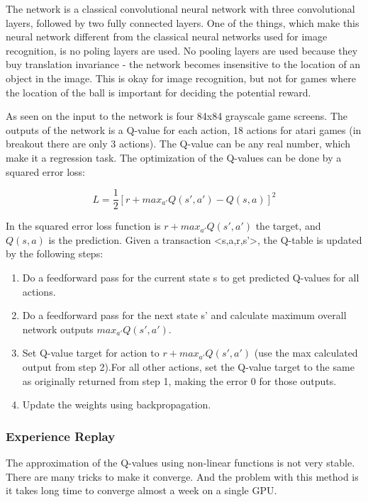 The network is a classical convolutional neural network with three convolutional layers, followed by two fully connected layers. One of the things, which make this neural network different from the classical neural networks used for image recognition, is no poling layers are used. No pooling layers are used because they buy translation invariance -  the network becomes insensitive to the location of an object in the image. This is okay for image recognition, but not for games where the location of the ball is important for deciding the potential reward.  

As seen on  the input to the network is four 84x84 grayscale game screens. The outputs of the network is a Q-value for each action, 18 actions for atari games (in breakout there are only 3 actions). The Q-value can be any real number, which make it a regression task. The optimization of the Q-values can be done by a squared error loss:

\begin{equation}
L=\frac{1}{2}[r+max_{a'}Q(s',a')-Q(s,a)]^2
\end{equation}  

In the squared error loss function is $r+max_{a'}Q(s',a')$ the target, and $Q(s,a)$ is the prediction. Given a transaction <s,a,r,s'>, the Q-table is updated by the following steps:
\begin{enumerate}
	\item Do a feedforward pass for the current state s to get predicted Q-values for all actions.
	\item Do a feedforward pass for the next state s’ and calculate maximum overall network outputs $max_{a'}Q(s',a')$.
	\item Set Q-value target for action to $r+max_{a'}Q(s',a')$ (use the max calculated output from step 2).For all other actions, set the Q-value target to the same as originally returned from step 1, making the error 0 for those outputs. 
	\item Update the weights using backpropagation.
\end{enumerate}

\subsubsection{Experience Replay}
The approximation of the Q-values using non-linear functions is not very stable. There are many tricks to make it converge. And the problem with this method is it takes long time to converge almost a week on a single GPU.  

